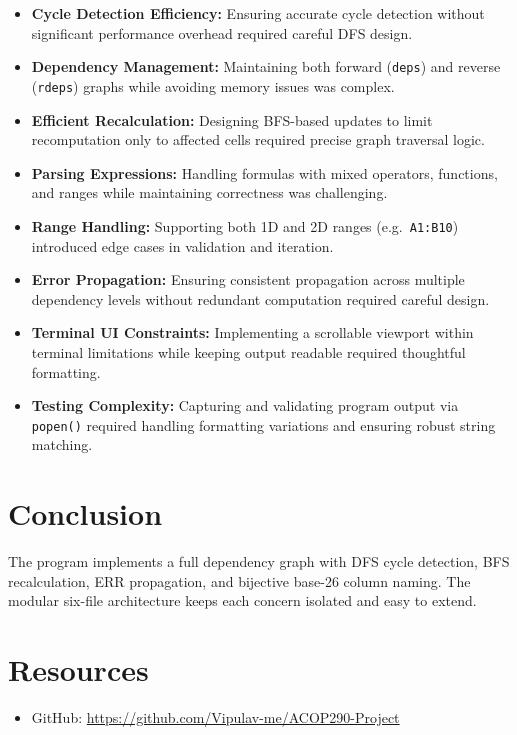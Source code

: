 \documentclass[11pt,a4paper]{article}
\begin{document}
\begin{itemize}
    \item \textbf{Cycle Detection Efficiency:} Ensuring accurate cycle detection without significant performance overhead required careful DFS design.
    
    \item \textbf{Dependency Management:} Maintaining both forward (\texttt{deps}) and reverse (\texttt{rdeps}) graphs while avoiding memory issues was complex.
    
    \item \textbf{Efficient Recalculation:} Designing BFS-based updates to limit recomputation only to affected cells required precise graph traversal logic.
    
    \item \textbf{Parsing Expressions:} Handling formulas with mixed operators, functions, and ranges while maintaining correctness was challenging.
    
    \item \textbf{Range Handling:} Supporting both 1D and 2D ranges (e.g.\ \texttt{A1:B10}) introduced edge cases in validation and iteration.
    
    \item \textbf{Error Propagation:} Ensuring consistent propagation across multiple dependency levels without redundant computation required careful design.
    
    \item \textbf{Terminal UI Constraints:} Implementing a scrollable viewport within terminal limitations while keeping output readable required thoughtful formatting.
    
    \item \textbf{Testing Complexity:} Capturing and validating program output via \texttt{popen()} required handling formatting variations and ensuring robust string matching.
\end{itemize}

\section{Conclusion}

The program implements a full dependency graph with DFS cycle detection, BFS recalculation, ERR propagation, and bijective base-26 column naming. The modular six-file architecture keeps each concern isolated and easy to extend.

\section{Resources}
\begin{itemize}
    \item GitHub: \url{https://github.com/Vipulav-me/ACOP290-Project}
\end{itemize}
\end{document}
